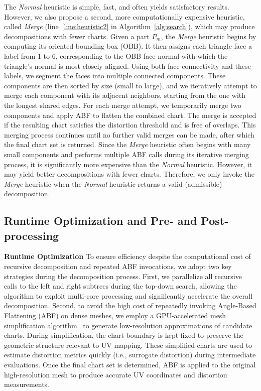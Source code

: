 The \emph{Normal} heuristic is simple, fast, and often yields satisfactory results. However, we also propose a second, more computationally expensive heuristic, called \emph{Merge} (line~\ref{line:heuristic2} in Algorithm~\ref{alg:search}), which may produce decompositions with fewer charts. Given a part $P_m$, the \emph{Merge} heuristic begins by computing its oriented bounding box (OBB). It then assigns each triangle face a label from 1 to 6, corresponding to the OBB face normal with which the triangle’s normal is most closely aligned. Using both face connectivity and these labels, we segment the faces into multiple connected components. These components are then sorted by size (small to large), and we iteratively attempt to merge each component with its adjacent neighbors, starting from the one with the longest shared edges. For each merge attempt, we temporarily merge two components and apply ABF to flatten the combined chart. The merge is accepted if the resulting chart satisfies the distortion threshold and is free of overlaps. This merging process continues until no further valid merges can be made, after which the final chart set is returned. Since the \emph{Merge} heuristic often begins with many small components and performs multiple ABF calls during its iterative merging process, it is significantly more expensive than the \emph{Normal} heuristic. However, it may yield better decompositions with fewer charts. Therefore, we only invoke the \emph{Merge} heuristic when the \emph{Normal} heuristic returns a valid (admissible) decomposition.

\subsection{Runtime Optimization and Pre- and Post-processing}
\label{sec:runtime}

\textbf{Runtime Optimization} To ensure efficiency despite the computational cost of recursive decomposition and repeated ABF invocations, we adopt two key strategies during the decomposition process. First, we parallelize all recursive calls to the left and right subtrees during the top-down search, allowing the algorithm to exploit multi-core processing and significantly accelerate the overall decomposition. Second, to avoid the high cost of repeatedly invoking Angle-Based Flattening (ABF) on dense meshes, we employ a GPU-accelerated mesh simplification algorithm~\cite{oh2025pamo} to generate low-resolution approximations of candidate charts. During simplification, the chart boundary is kept fixed to preserve the geometric structure relevant to UV mapping. These simplified charts are used to estimate distortion metrics quickly (i.e., surrogate distortion) during intermediate evaluations. Once the final chart set is determined, ABF is applied to the original high-resolution mesh to produce accurate UV coordinates and distortion measurements.

